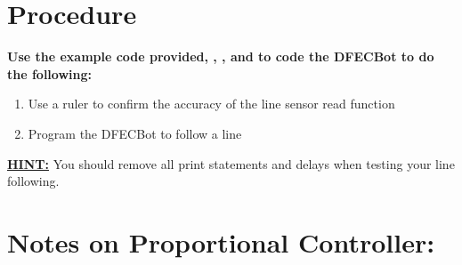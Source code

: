 \documentclass{handout}
\begin{document}
	\section{Procedure}
	\textbf{Use the example code provided, , , and  to code the DFECBot to do the following:}
		
	\begin{enumerate}
		\item Use a ruler to confirm the accuracy of the line sensor read function
		\item Program the DFECBot to follow a line
	\end{enumerate}
	{\large \textbf{\underline{HINT:}}} You should remove all print statements and delays when testing your line following.
	\section{Notes on Proportional Controller:}
\end{document}
